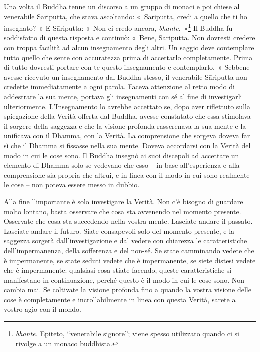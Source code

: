 Una volta il Buddha tenne un discorso a un gruppo di monaci e poi chiese
al venerabile Sāriputta, che stava ascoltando: «~Sāriputta, credi a
quello che ti ho insegnato?~» E Sāriputta: «~Non ci credo ancora,
\emph{bhante}.~»\footnote{\emph{bhante.} Epiteto, ``venerabile signore''; viene spesso
  utilizzato quando ci si rivolge a un monaco buddhista.}
Il Buddha fu soddisfatto di questa risposta e continuò:
«~Bene, Sāriputta. Non dovresti credere con troppa facilità ad alcun
insegnamento degli altri. Un saggio deve contemplare tutto quello che
sente con accuratezza prima di accettarlo completamente. Prima di tutto
dovresti portare con te questo insegnamento e contemplarlo.~» Sebbene
avesse ricevuto un insegnamento dal Buddha stesso, il venerabile
Sāriputta non credette immediatamente a ogni parola. Faceva attenzione
al retto modo di addestrare la sua mente, portava gli insegnamenti con
sé al fine di investigarli ulteriormente. L'Insegnamento lo avrebbe
accettato se, dopo aver riflettuto sulla spiegazione della Verità
offerta dal Buddha, avesse constatato che essa stimolava il sorgere
della saggezza e che la visione profonda rasserenava la sua mente e la
unificava con il Dhamma, con la Verità. La comprensione che sorgeva
doveva far sì che il Dhamma si fissasse nella sua mente. Doveva
accordarsi con la Verità del modo in cui le cose sono. Il Buddha insegnò
ai suoi discepoli ad accettare un elemento di Dhamma solo se vedevano
che esso -- in base all'esperienza e alla comprensione sia propria che
altrui, e in linea con il modo in cui sono realmente le cose -- non
poteva essere messo in dubbio.

Alla fine l'importante è solo investigare la Verità. Non c'è bisogno di
guardare molto lontano, basta osservare che cosa sta avvenendo nel
momento presente. Osservate che cosa sta succedendo nella vostra mente.
Lasciate andare il passato. Lasciate andare il futuro. Siate consapevoli
solo del momento presente, e la saggezza sorgerà dall'investigazione e
dal vedere con chiarezza le caratteristiche dell'impermanenza, della
sofferenza e del non-sé. Se state camminando vedete che è impermanente,
se state seduti vedete che è impermanente, se siete distesi vedete che è
impermanente: qualsiasi cosa stiate facendo, queste caratteristiche si
manifestano in continuazione, perché questo è il modo in cui le cose
sono. Non cambia mai. Se coltivate la visione profonda fino a quando la
vostra visione delle cose è completamente e incrollabilmente in linea
con questa Verità, sarete a vostro agio con il mondo.

